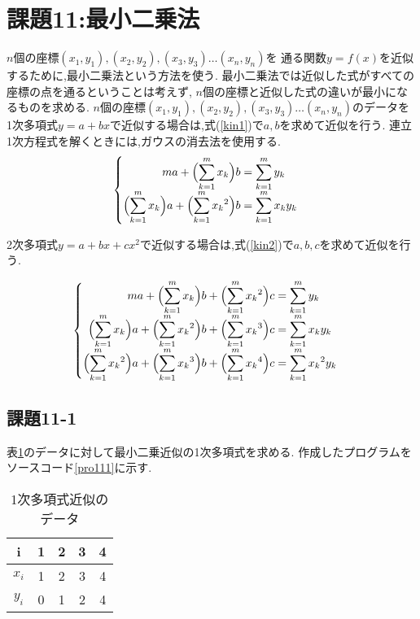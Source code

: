 \documentclass[a4j]{jsarticle}
\begin{document}
\section{課題11:最小二乗法}
$n$個の座標$(x_1,y_1),(x_2,y_2),(x_3,y_3)\ldots(x_n,y_n)$を
通る関数$y=f(x)$を近似するために,最小二乗法という方法を使う.
最小二乗法では近似した式がすべての座標の点を通るということは考えず,
$n$個の座標と近似した式の違いが最小になるものを求める.
$n$個の座標$(x_1,y_1),(x_2,y_2),(x_3,y_3)\ldots(x_n,y_n)$のデータを
1次多項式$y=a+bx$で近似する場合は,式(\ref{kin1})で$a,b$を求めて近似を行う.
連立1次方程式を解くときには,ガウスの消去法を使用する.
\begin{eqnarray}
 \begin{cases}
  \begin{split}
   ma + \Bigl(\sum_{k=1}^{m} x_k\Bigr)b &= \sum_{k=1}^{m} y_k\\
   \Bigl(\sum_{k=1}^{m} x_k\Bigr)a + \Bigl(\sum_{k=1}^{m} {x_k}^2 \Bigr)b &= \sum_{k=1}^{m} x_ky_k
  \end{split}
 \end{cases}
 \label{kin1}
\end{eqnarray}

2次多項式$y=a+bx+cx^2$で近似する場合は,式(\ref{kin2})で$a,b,c$を求めて近似を行う.

\begin{eqnarray}
 \begin{cases}
  \begin{split}
   ma + \Bigl(\sum_{k=1}^{m} x_k\Bigr)b + \Bigl(\sum_{k=1}^{m} {x_k}^2\Bigr)c  &= \sum_{k=1}^{m} y_k\\
   \Bigl(\sum_{k=1}^{m} x_k\Bigr)a + \Bigl(\sum_{k=1}^{m} {x_k}^2 \Bigr)b + \Bigl(\sum_{k=1}^{m} {x_k}^3\Bigr)c &= 
   \sum_{k=1}^{m} x_ky_k\\
   \Bigl(\sum_{k=1}^{m} {x_k}^2\Bigr)a + \Bigl(\sum_{k=1}^{m} {x_k}^3\Bigr)b + \Bigl(\sum_{k=1}^{m} {x_k}^4\Bigr)c &=
   \sum_{k=1}^{m} {x_k}^2y_k
  \end{split}
 \end{cases}
 \label{kin2}
\end{eqnarray}




\subsection{課題11-1}
表\ref{data111}のデータに対して最小二乗近似の1次多項式を求める.
作成したプログラムをソースコード\ref{pro111}に示す.
\begin{table}[H]
 \centering
 \caption{1次多項式近似のデータ}
\label{data111}
 \begin{tabular}{|c||c|c|c|c|}
  \hline
  i&1&2&3&4\\
  \hline
  \hline
  $x_i$&1&2&3&4\\
  \hline
  $y_i$&0&1&2&4\\
  \hline
 \end{tabular}
\end{table}
\end{document}

